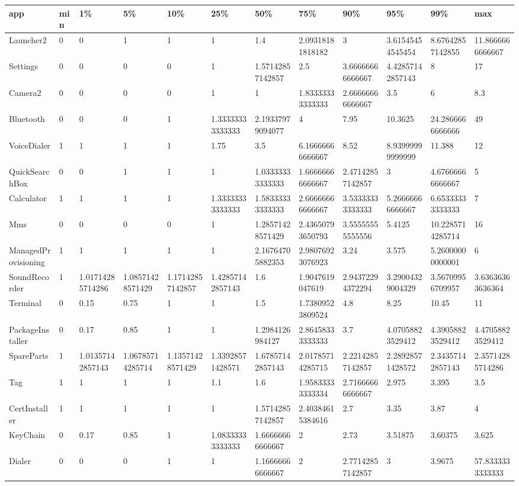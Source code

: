 \begin{tabular}{|l|l|l|l|l|l|l|l|l|l|l|l|}
\hline
app&min&1\%&5\%&10\%&25\%&50\%&75\%&90\%&95\%&99\%&max\\
\hline
Launcher2&0&0&1&1&1&1.4&2.09318181818182&3&3.61545454545454&8.67642857142855&11.8666666666667\\
\hline
Settings&0&0&0&0&1&1.57142857142857&2.5&3.66666666666667&4.42857142857143&8&17\\
\hline
Camera2&0&0&0&0&1&1&1.83333333333333&2.66666666666667&3.5&6&8.3\\
\hline
Bluetooth&0&0&0&1&1.33333333333333&2.19337979094077&4&7.95&10.3625&24.2866666666666&49\\
\hline
VoiceDialer&1&1&1&1&1.75&3.5&6.16666666666667&8.52&8.93999999999999&11.388&12\\
\hline
QuickSearchBox&0&0&1&1&1&1.03333333333333&1.66666666666667&2.47142857142857&3&4.67666666666667&5\\
\hline
Calculator&1&1&1&1&1.33333333333333&1.58333333333333&2.66666666666667&3.53333333333333&5.26666666666667&6.65333333333333&7\\
\hline
Mms&0&0&0&0&1&1.28571428571429&2.43650793650793&3.55555555555556&5.4125&10.2285714285714&16\\
\hline
ManagedProvisioning&1&1&1&1&1&2.16764705882353&2.98076923076923&3.24&3.575&5.26000000000001&6\\
\hline
SoundRecorder&1&1.01714285714286&1.08571428571429&1.17142857142857&1.42857142857143&1.6&1.9047619047619&2.94372294372294&3.29004329004329&3.56709956709957&3.63636363636364\\
\hline
Terminal&0&0.15&0.75&1&1&1.5&1.73809523809524&4.8&8.25&10.45&11\\
\hline
PackageInstaller&0&0.17&0.85&1&1&1.2984126984127&2.86458333333333&3.7&4.07058823529412&4.39058823529412&4.47058823529412\\
\hline
SpareParts&1&1.01357142857143&1.06785714285714&1.13571428571429&1.33928571428571&1.67857142857143&2.01785714285715&2.22142857142857&2.28928571428572&2.34357142857143&2.35714285714286\\
\hline
Tag&1&1&1&1&1.1&1.6&1.95833333333334&2.71666666666667&2.975&3.395&3.5\\
\hline
CertInstaller&1&1&1&1&1&1.57142857142857&2.40384615384616&2.7&3.35&3.87&4\\
\hline
KeyChain&0&0.17&0.85&1&1.08333333333333&1.66666666666667&2&2.73&3.51875&3.60375&3.625\\
\hline
Dialer&0&0&0&1&1&1.16666666666667&2&2.77142857142857&3&3.9675&57.8333333333333\\

\end{tabular}
